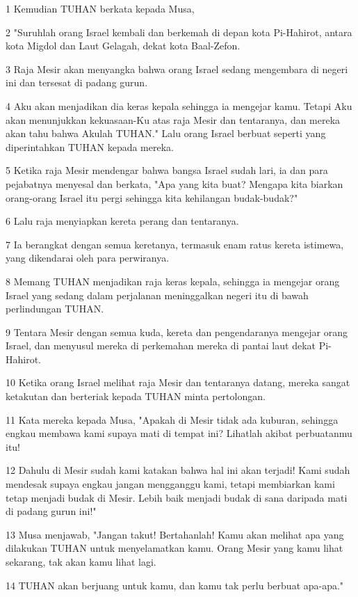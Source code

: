\par 1 Kemudian TUHAN berkata kepada Musa,
\par 2 "Suruhlah orang Israel kembali dan berkemah di depan kota Pi-Hahirot, antara kota Migdol dan Laut Gelagah, dekat kota Baal-Zefon.
\par 3 Raja Mesir akan menyangka bahwa orang Israel sedang mengembara di negeri ini dan tersesat di padang gurun.
\par 4 Aku akan menjadikan dia keras kepala sehingga ia mengejar kamu. Tetapi Aku akan menunjukkan kekuasaan-Ku atas raja Mesir dan tentaranya, dan mereka akan tahu bahwa Akulah TUHAN." Lalu orang Israel berbuat seperti yang diperintahkan TUHAN kepada mereka.
\par 5 Ketika raja Mesir mendengar bahwa bangsa Israel sudah lari, ia dan para pejabatnya menyesal dan berkata, "Apa yang kita buat? Mengapa kita biarkan orang-orang Israel itu pergi sehingga kita kehilangan budak-budak?"
\par 6 Lalu raja menyiapkan kereta perang dan tentaranya.
\par 7 Ia berangkat dengan semua keretanya, termasuk enam ratus kereta istimewa, yang dikendarai oleh para perwiranya.
\par 8 Memang TUHAN menjadikan raja keras kepala, sehingga ia mengejar orang Israel yang sedang dalam perjalanan meninggalkan negeri itu di bawah perlindungan TUHAN.
\par 9 Tentara Mesir dengan semua kuda, kereta dan pengendaranya mengejar orang Israel, dan menyusul mereka di perkemahan mereka di pantai laut dekat Pi-Hahirot.
\par 10 Ketika orang Israel melihat raja Mesir dan tentaranya datang, mereka sangat ketakutan dan berteriak kepada TUHAN minta pertolongan.
\par 11 Kata mereka kepada Musa, "Apakah di Mesir tidak ada kuburan, sehingga engkau membawa kami supaya mati di tempat ini? Lihatlah akibat perbuatanmu itu!
\par 12 Dahulu di Mesir sudah kami katakan bahwa hal ini akan terjadi! Kami sudah mendesak supaya engkau jangan mengganggu kami, tetapi membiarkan kami tetap menjadi budak di Mesir. Lebih baik menjadi budak di sana daripada mati di padang gurun ini!"
\par 13 Musa menjawab, "Jangan takut! Bertahanlah! Kamu akan melihat apa yang dilakukan TUHAN untuk menyelamatkan kamu. Orang Mesir yang kamu lihat sekarang, tak akan kamu lihat lagi.
\par 14 TUHAN akan berjuang untuk kamu, dan kamu tak perlu berbuat apa-apa."
